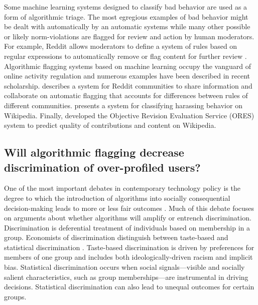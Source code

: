 \documentclass[format=acmsmall, natbib=true,  screen=true]{acmart}
\begin{document}
Some machine learning systems designed to classify bad behavior are used as a form of algorithmic triage. The most egregious examples of bad behavior might be dealt with automatically by an automatic systems while many other possible or likely norm-violations are flagged for review and action by human moderators.
For example, Reddit allows moderators to define a system of rules based on regular expressions to automatically remove or flag content for further review \cite{jhaver_human-machine_2019}. Algorithmic flagging systems based on machine learning occupy the vanguard of online activity regulation and numerous examples have been described in recent scholarship. 
\citet{chandrasekharan_crossmod:_2019} describes a system for Reddit communities to share information and collaborate on automatic flagging that accounts for differences between rules of different communities.
\citet{wulczyn_ex_2017} presents a system for classifying harassing behavior on Wikipedia. Finally, \citet{halfaker_ores:_2019} developed the Objective Revision Evaluation Service (ORES) system to predict quality of contributions and content on Wikipedia.

\subsection{Will algorithmic flagging decrease discrimination of over-profiled users?}

One of the most important debates in contemporary technology policy is the degree to which the introduction of algorithms into socially consequential decision-making leads to more or less fair outcomes \citep{chouldechova_fair_2017, kleinberg_human_2018, oneil_weapons_2018, selbst_fairness_2019}. Much of this debate focuses on arguments about whether algorithms will amplify or entrench discrimination. 
Discrimination is deferential treatment of individuals based on membership in a group. Economists of discrimination distinguish between taste-based and statistical discrimination \citep{becker_economics_1957, bertrand_field_2016, phelps_statistical_1972}.  Taste-based discrimination is driven by preferences for members of one group and includes both ideologically-driven racism and implicit bias.  Statistical discrimination occurs when social signals---visible and socially salient characteristics, such as group memberships---are instrumental in driving decisions. Statistical discrimination can also lead to unequal outcomes for certain groups.
\end{document}
